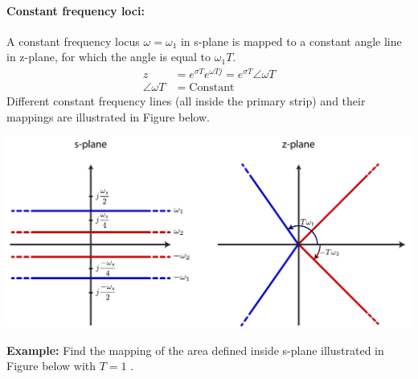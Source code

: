 \documentclass[twoside]{article}
\begin{document}
\paragraph{Constant frequency loci:} A constant frequency locus
$\omega = \omega_1$ in s-plane is mapped to a constant angle
line in z-plane, for which the angle is equal to $\omega_1 T$.
%
\begin{align*}
z &= e^{\sigma T} e^{\omega T j} =  e^{\sigma T} \angle \omega T\\
\angle \omega T &= \mathrm{Constant}
\end{align*}
%
Different constant frequency lines (all inside the primary strip) and
their mappings are illustrated in Figure below.
%
    \begin{center}
\begin{minipage}[h]{0.85\linewidth}
    \begin{center}
      \includegraphics[width=\textwidth]{freq}
    \end{center}
\end{minipage}
    \end{center}
%
\textbf{Example:} Find the mapping of the area defined inside s-plane
illustrated in Figure below with $T=1$ .
%
\end{document}
